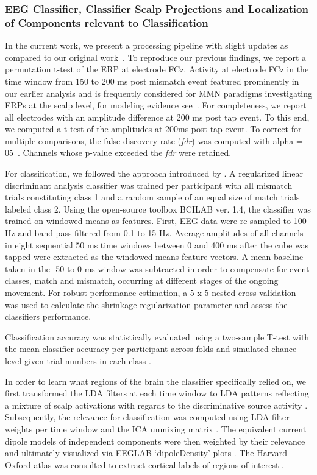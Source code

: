 \subsubsection{EEG Classifier, Classifier Scalp Projections and Localization of Components relevant to Classification}

In the current work, we present a processing pipeline with slight updates as compared to our original work~\cite{Gehrke2019-og}. To reproduce our previous findings, we report a permutation t-test of the ERP at electrode FCz. Activity at electrode FCz in the time window from 150 to 200 ms post mismatch event featured prominently in our earlier analysis and is frequently considered for MMN paradigms investigating ERPs at the scalp level, for modeling evidence see~\cite{Lieder2013-dl, Lieder2013-os}. \textcolor{n}{For completeness, we report all electrodes with an amplitude difference at 200 ms post tap event. To this end, we computed a t-test of the amplitudes at 200ms post tap event. To correct for multiple comparisons, the false discovery rate (\textit{fdr}) was computed with alpha = 05~\cite{Benjamini1995-cw}. Channels whose p-value exceeded the \textit{fdr} were retained.}

For classification, we followed the approach introduced by \cite{Zander2016-ed}. A regularized linear discriminant analysis classifier was trained per participant with all mismatch trials constituting class 1 and a random sample of an equal size of match trials labeled class 2. Using the open-source toolbox BCILAB ver. 1.4, the classifier was trained on windowed means as features. First, EEG data were re-sampled to 100 Hz and band-pass filtered from 0.1 to 15 Hz. Average amplitudes of all channels in eight sequential 50 ms time windows between 0 and 400 ms after the cube was tapped were extracted as the windowed means feature vectors. A mean baseline taken in the -50 to 0 ms window was subtracted in order to compensate for event classes, match and mismatch, occurring at different stages of the ongoing movement. For robust performance estimation, a 5 x 5 nested cross-validation was used to calculate the shrinkage regularization parameter and assess the classifiers performance.

Classification accuracy was statistically evaluated using a two-sample T-test with the mean classifier accuracy per participant across folds and simulated chance level given trial numbers in each class \cite{Muller-Putz2007-oc}.

In order to learn what regions of the brain the classifier specifically relied on, we first transformed the LDA filters at each time window to LDA patterns reflecting a mixture of scalp activations with regards to the discriminative source activity \cite{Haufe2014-do}. Subsequently, the relevance for classification was computed using LDA filter weights per time window and the ICA u\textcolor{n}{n}mixing matrix \cite{Zander2016-ed}. The equivalent current dipole models of independent components were then weighted by their relevance and ultimately visualized via EEGLAB `dipoleDensity' plots \cite{Krol2018-cw}. The Harvard-Oxford atlas was consulted to extract cortical labels of regions of interest \cite{Makris2006-kp}.




